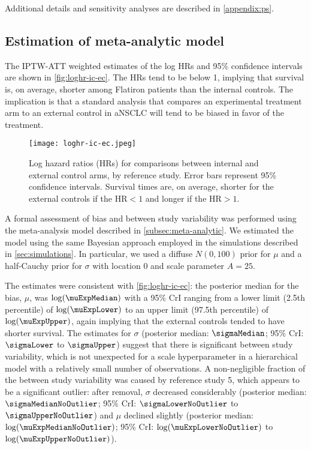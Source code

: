\documentclass[11pt,final,fleqn]{article}\usepackage[]{graphicx}\usepackage[]{color}
\begin{document}
Additional details and sensitivity analyses are described in \autoref{appendix:ps}.

\subsection{Estimation of meta-analytic model}
The IPTW-ATT weighted estimates of the log HRs and 95\% confidence intervals are shown in \autoref{fig:loghr-ic-ec}. The HRs tend to be below 1, implying that survival is, on average, shorter among Flatiron patients than the internal controls. The implication is that a standard analysis that compares an experimental treatment arm to an external control in aNSCLC will tend to be biased in favor of the treatment.

\begin{figure}[h]
\centering
\texttt{[image: loghr-ic-ec.jpeg]} 
\caption{Log hazard ratios (HRs) for comparisons between internal and external control arms, by reference study. Error bars represent 95\% confidence intervals. Survival times are, on average, shorter for the external controls if the $\text{HR} < 1$ and longer if the $\text{HR} > 1$.}
\label{fig:loghr-ic-ec}
\end{figure}

A formal assessment of bias and between study variability was performed using the meta-analysis model described in \autoref{subsec:meta-analytic}. We estimated the model using the same Bayesian approach employed in the simulations described in \autoref{sec:simulations}. In particular, we used a diffuse $N(0, 100)$ prior for $\mu$ and a half-Cauchy prior for $\sigma$ with location $0$ and scale parameter $A = 25$.

The estimates were consistent with  \autoref{fig:loghr-ic-ec}: the posterior median for the bias, $\mu$, was $\log(\muExpMedian)$ with a 95\% CrI ranging from a lower limit (2.5th percentile) of $\log(\muExpLower)$ to an upper limit (97.5th percentile) of  $\log(\muExpUpper)$, again implying that the external controls tended to have shorter survival. The estimates for $\sigma$ (posterior median: $\sigmaMedian$; 95\% CrI: $\sigmaLower$ to $\sigmaUpper$) suggest that there is significant between study variability, which is not unexpected for a scale hyperparameter in a hierarchical model with a relatively small number of observations. A non-negligible fraction of the between study variability was caused by reference study 5, which appears to be a significant outlier: after removal, $\sigma$ decreased considerably (posterior median: $\sigmaMedianNoOutlier$; 95\% CrI: $\sigmaLowerNoOutlier$ to $\sigmaUpperNoOutlier$) and $\mu$ declined slightly (posterior median: $\log(\muExpMedianNoOutlier)$; 95\% CrI: $\log(\muExpLowerNoOutlier)$ to $\log(\muExpUpperNoOutlier)$).
\end{document}
